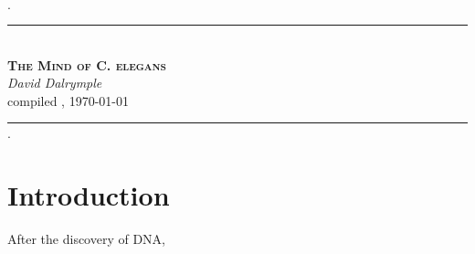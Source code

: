 \documentclass[letter,11pt]{article}
\begin{document}
\thispagestyle{empty}
{\color{white} $\cdot$}
\begin{center}
	\rule[2mm]{0.66\textwidth}{0.25mm}\\[0mm]
	\textsc{\Huge \bfseries The Mind of C. elegans}\\[3mm]
	\textit{\Large David Dalrymple}\\[2mm]
	{\large compiled \currenttime, \today\\[0mm]}
	\rule[2mm]{0.66\textwidth}{0.25mm}
\end{center}
\vspace{1cm}
{\color{white} $\cdot$}

\clearpage

\section*{Introduction}

After the discovery of DNA, 
\end{document}
